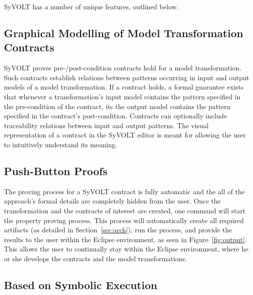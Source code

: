 SyVOLT has a number of unique features, outlined below.

\subsection{Graphical Modelling of Model Transformation Contracts}

SyVOLT proves pre-/post-condition contracts hold for a model transformation.
Such contracts establish relations between patterns occurring in input and output
models of a model transformation. If a contract holds, a formal guarantee
exists that whenever a transformation's input model contains the pattern
specified in the pre-condition of the contract, its the output model contains
the pattern specified in the contract's post-condition. Contracts can 
optionally include traceability relations between input and output patterns. The
visual representation of a contract in the SyVOLT editor is meant for allowing
the user to intuitively understand its meaning.


\subsection{Push-Button Proofs}
\label{sec:push_button_proofs}
The proving process for a SyVOLT contract is fully automatic and the all of the
approach's formal details are completely hidden from the user. Once the
transformation and the contracts of interest are created, one command will start
the property proving process. This process will automatically create all
required artifacts (as detailed in Section~\ref{sec:arch}), run the process, and
provide the results to the user within the Eclipse environment, as seen in
Figure~\ref{fig:output}. This allows the user to continually stay within the
Eclipse environment, where he or she develops the contracts and the
model transformations.

\subsection{Based on Symbolic Execution}

